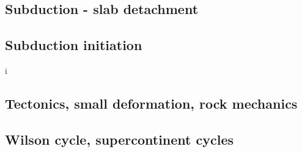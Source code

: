 \cite{jarr86}
\cite{hstt90}
\cite{zhgu92}
\cite{jope93}\cite{dvnm93}
\cite{zhgu94}
\cite{hajc97}
\cite{itki98}
\cite{hagu99}
\cite{jalo05}\cite{lahb05}
\cite{degw06}
\cite{artd07}\cite{yaab07}
\cite{yaba08}\cite{ozrs08}\cite{dihf08}
\cite{yahb09}
\cite{hagr10}
\cite{lobh10}
\cite{lixg11}\cite{list11}
\cite{anwb12}\cite{jahu12}\cite{jabi12}\cite{jabk12}\cite{lixg12}\cite{lixg13}
\cite{nabg13}\cite{hage13}\cite{ancv13}\cite{namu13}\cite{yosh13}\cite{zhgt13}\cite{jabr13}\cite{izht13}
\cite{luws13}\cite{dusc13}
\cite{hond14}

\subsection*{Subduction - slab detachment}

\cite{yowo95}
\cite{desw98}
\cite{anbi09}
\cite{dugm11}
\cite{dugk12}
\cite{dusg12}
\cite{dugs14}

\subsection*{Subduction initiation}

\cite{dohe01}
\cite{hags03}
\cite{nigm10}
\cite{dyge13}
i

\subsection*{Tectonics, small deformation, rock mechanics}

\cite{ilma93}
\cite{hept96}
\cite{lega12}

\subsection*{Wilson cycle, supercontinent cycles}

\cite{zhzl07}
\cite{zhzm09}





